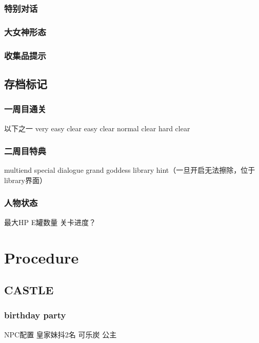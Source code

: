 \documentclass{article}
\begin{document}
\subsubsection{特别对话}

\subsubsection{大女神形态}

\subsubsection{收集品提示}

\subsection{存档标记}

\subsubsection{一周目通关}

以下之一
very easy clear
easy clear
normal clear
hard clear

\subsubsection{二周目特典}

multiend
special dialogue
grand goddess
library hint（一旦开启无法擦除，位于library界面）

\subsubsection{人物状态}

最大HP
E罐数量
关卡进度？


\section{Procedure}

\subsection{CASTLE}

\subsubsection{birthday party}

NPC配置 皇家妹抖2名 可乐炭 公主
\end{document}
